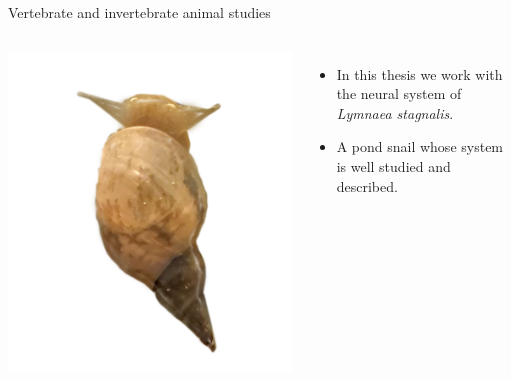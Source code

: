 \documentclass[aspectratio=43]{beamer}
\begin{document}
\begin{frame}{Vertebrate and invertebrate animal studies}

		\begin{columns}[t]
			\includegraphics[width=\linewidth]{intro/lymnaea.png}
			
			\vspace{-4cm} %
			\raggedleft
			\begin{itemize}
				\item<1->In this thesis we work with the neural system of \textit{Lymnaea stagnalis}.
				\item<2>A pond snail whose system is well studied and described.
			\end{itemize}
		\end{columns}
	
\end{frame}
\end{document}
